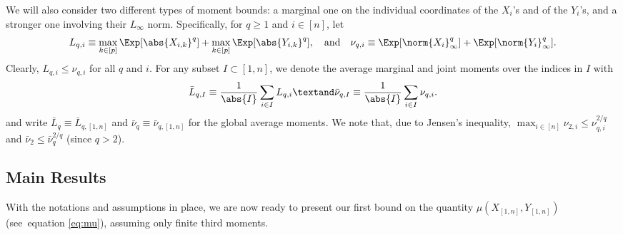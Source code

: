 \documentclass[aos]{imsart}
\begin{document}
We will also consider two different types of moment bounds: a marginal one on the individual coordinates of the $X_i$'s and of the $Y_i$'s, and a stronger one involving their $L_\infty$ norm. Specifically, for $q \geq 1$ and $i \in [n]$, let 
\begin{equation}\label{eq:definition-L-nu}
    L_{q,i} \equiv \max_{k \in [p]} \Exp[\abs{X_{i,k}}^q] + \max_{k \in [p]} \Exp[\abs{Y_{i,k}}^q],\quad\mbox{and}\quad
    \nu_{q,i} \equiv \Exp[\norm{X_{i}}_\infty^q] + \Exp[\norm{Y_{i}}_\infty^q].
\end{equation}
Clearly, $L_{q,i} \leq \nu_{q,i}$ for all $q$ and $i$.
For any subset $I \subset [1,n]$, we denote the average marginal and joint moments over the indices in $I$ with
\begin{equation}\label{eq:definition-L-bar-I-and-nu-bar-I}
    \bar{L}_{q,I} \equiv \frac{1}{\abs{I}} \sum_{i \in I} L_{q,i}
    \textand
    \bar\nu_{q,I} \equiv \frac{1}{\abs{I}} \sum_{i \in I} \nu_{q,i}.
\end{equation}
and write $\bar{L}_q \equiv \bar{L}_{q,[1,n]}$ and $\bar{\nu}_q \equiv \bar{\nu}_{q,[1,n]}$ for the global average moments.
We note that, due to Jensen's inequality, $\max_{i \in [n]} \nu_{2,i} \leq \nu_{q,i}^{2/q}$  and $\bar\nu_2 \leq \bar\nu_q^{2/q}$ (since  $q > 2$). 

\subsection{Main Results}\label{sec:main}

With the notations and assumptions in place, we are now ready to present our first bound on the quantity $\mu\left( X_{[1,n]}, Y_{[1,n]} \right)$ (see~equation \ref{eq:mu}),  assuming only finite third moments. 
\end{document}
